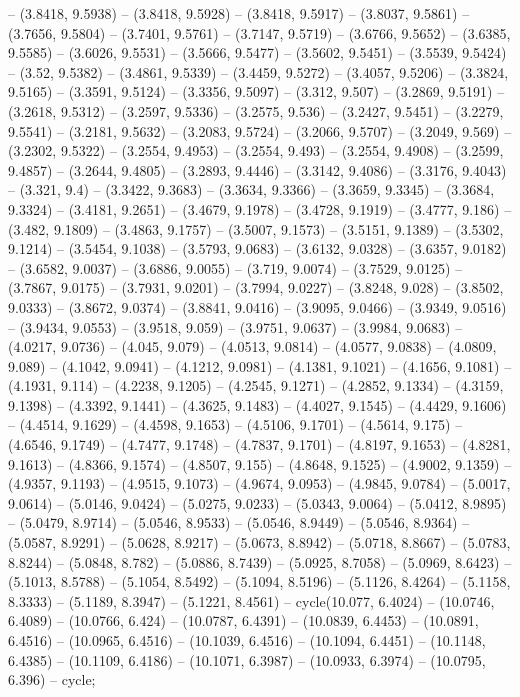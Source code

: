 -- (3.8418, 9.5938) -- (3.8418, 9.5928) -- (3.8418, 9.5917) -- (3.8037, 9.5861) -- (3.7656, 9.5804) -- (3.7401, 9.5761) -- (3.7147, 9.5719) -- (3.6766, 9.5652) -- (3.6385, 9.5585) -- (3.6026, 9.5531) -- (3.5666, 9.5477) -- (3.5602, 9.5451) -- (3.5539, 9.5424) -- (3.52, 9.5382) -- (3.4861, 9.5339) -- (3.4459, 9.5272) -- (3.4057, 9.5206) -- (3.3824, 9.5165) -- (3.3591, 9.5124) -- (3.3356, 9.5097) -- (3.312, 9.507) -- (3.2869, 9.5191) -- (3.2618, 9.5312) -- (3.2597, 9.5336) -- (3.2575, 9.536) -- (3.2427, 9.5451) -- (3.2279, 9.5541) -- (3.2181, 9.5632) -- (3.2083, 9.5724) -- (3.2066, 9.5707) -- (3.2049, 9.569) -- (3.2302, 9.5322) -- (3.2554, 9.4953) -- (3.2554, 9.493) -- (3.2554, 9.4908) -- (3.2599, 9.4857) -- (3.2644, 9.4805) -- (3.2893, 9.4446) -- (3.3142, 9.4086) -- (3.3176, 9.4043) -- (3.321, 9.4) -- (3.3422, 9.3683) -- (3.3634, 9.3366) -- (3.3659, 9.3345) -- (3.3684, 9.3324) -- (3.4181, 9.2651) -- (3.4679, 9.1978) -- (3.4728, 9.1919) -- (3.4777, 9.186) -- (3.482, 9.1809) -- (3.4863, 9.1757) -- (3.5007, 9.1573) -- (3.5151, 9.1389) -- (3.5302, 9.1214) -- (3.5454, 9.1038) -- (3.5793, 9.0683) -- (3.6132, 9.0328) -- (3.6357, 9.0182) -- (3.6582, 9.0037) -- (3.6886, 9.0055) -- (3.719, 9.0074) -- (3.7529, 9.0125) -- (3.7867, 9.0175) -- (3.7931, 9.0201) -- (3.7994, 9.0227) -- (3.8248, 9.028) -- (3.8502, 9.0333) -- (3.8672, 9.0374) -- (3.8841, 9.0416) -- (3.9095, 9.0466) -- (3.9349, 9.0516) -- (3.9434, 9.0553) -- (3.9518, 9.059) -- (3.9751, 9.0637) -- (3.9984, 9.0683) -- (4.0217, 9.0736) -- (4.045, 9.079) -- (4.0513, 9.0814) -- (4.0577, 9.0838) -- (4.0809, 9.089) -- (4.1042, 9.0941) -- (4.1212, 9.0981) -- (4.1381, 9.1021) -- (4.1656, 9.1081) -- (4.1931, 9.114) -- (4.2238, 9.1205) -- (4.2545, 9.1271) -- (4.2852, 9.1334) -- (4.3159, 9.1398) -- (4.3392, 9.1441) -- (4.3625, 9.1483) -- (4.4027, 9.1545) -- (4.4429, 9.1606) -- (4.4514, 9.1629) -- (4.4598, 9.1653) -- (4.5106, 9.1701) -- (4.5614, 9.175) -- (4.6546, 9.1749) -- (4.7477, 9.1748) -- (4.7837, 9.1701) -- (4.8197, 9.1653) -- (4.8281, 9.1613) -- (4.8366, 9.1574) -- (4.8507, 9.155) -- (4.8648, 9.1525) -- (4.9002, 9.1359) -- (4.9357, 9.1193) -- (4.9515, 9.1073) -- (4.9674, 9.0953) -- (4.9845, 9.0784) -- (5.0017, 9.0614) -- (5.0146, 9.0424) -- (5.0275, 9.0233) -- (5.0343, 9.0064) -- (5.0412, 8.9895) -- (5.0479, 8.9714) -- (5.0546, 8.9533) -- (5.0546, 8.9449) -- (5.0546, 8.9364) -- (5.0587, 8.9291) -- (5.0628, 8.9217) -- (5.0673, 8.8942) -- (5.0718, 8.8667) -- (5.0783, 8.8244) -- (5.0848, 8.782) -- (5.0886, 8.7439) -- (5.0925, 8.7058) -- (5.0969, 8.6423) -- (5.1013, 8.5788) -- (5.1054, 8.5492) -- (5.1094, 8.5196) -- (5.1126, 8.4264) -- (5.1158, 8.3333) -- (5.1189, 8.3947) -- (5.1221, 8.4561) -- cycle(10.077, 6.4024) -- (10.0746, 6.4089) -- (10.0766, 6.424) -- (10.0787, 6.4391) -- (10.0839, 6.4453) -- (10.0891, 6.4516) -- (10.0965, 6.4516) -- (10.1039, 6.4516) -- (10.1094, 6.4451) -- (10.1148, 6.4385) -- (10.1109, 6.4186) -- (10.1071, 6.3987) -- (10.0933, 6.3974) -- (10.0795, 6.396) -- cycle;




